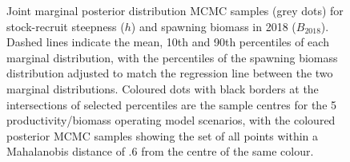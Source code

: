 \documentclass[11pt]{book}
\begin{document}
\begin{figure}[htb]

{\centering {} 

}

\caption{Joint marginal posterior distribution MCMC samples (grey dots) for stock-recruit steepness ($h$) and spawning biomass in 2018 ($B_{2018}$). Dashed lines indicate the mean, 10th and 90th percentiles of each marginal distribution, with the percentiles of the spawning biomass distribution adjusted to match the regression line between the two marginal distributions. Coloured dots with black borders at the intersections of selected percentiles are the sample centres for the 5 productivity/biomass operating model scenarios, with the coloured posterior MCMC samples showing the set of all points within a Mahalanobis distance of .6 from the centre of the same colour.}\label{fig:unnamed-chunk-15}
\end{figure}
\newpage
\end{document}
